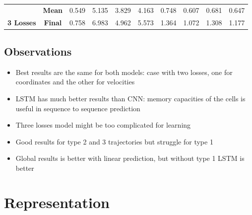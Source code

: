 \documentclass[a0,portrait]{a0poster}
\begin{document}
\begin{multicols}{2}
\begin{center}
\begin{tabular}{cc|c|c|c|c|c|c|c|c|}
\multicolumn{1}{|c|}{}                                   & \textbf{Mean}  &0.549                 &5.135                 &3.829                 &4.163                & 0.748           & 0.607           & 0.681           & 0.647                                  \\ \cline{2-10} 
\multicolumn{1}{|c|}{\multirow{-2}{*}{\textbf{3 Losses}}} & \textbf{Final} &0.758                 &6.983                 &4.962                 &5.573                & 1.364           & 1.072            & 1.308           & 1.177                                  \\ \hline
\end{tabular}
\end{center}
\subsection*{Observations}
\begin{itemize}
\justifying
\item Best results are the same for both models: case with two losses, one for coordinates and the other for velocities
\item LSTM has much better results than CNN: memory capacities of the cells is useful in sequence to sequence prediction
\item Three losses model might be too complicated for learning
\item Good results for type 2 and 3 trajectories but struggle for type 1
\item Global results is better with linear prediction, but without type 1 LSTM is better
\end{itemize}

\section*{Representation}


\end{multicols}
\end{document}
